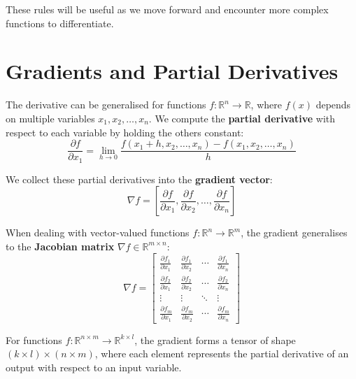 These rules will be useful as we move forward and encounter more complex functions to differentiate.

\section{Gradients and Partial Derivatives}

The derivative can be generalised for functions \( f : \mathbb{R}^n \to \mathbb{R} \), where \( f(x) \) depends on multiple variables \( x_1, x_2, \dots, x_n \). We compute the \textbf{partial derivative} with respect to each variable by holding the others constant:
\begin{equation}
    \frac{\partial f}{\partial x_1} = \lim_{h \to 0} \frac{f(x_1 + h, x_2, \dots, x_n) - f(x_1, x_2, \dots, x_n)}{h}
\end{equation}

We collect these partial derivatives into the \textbf{gradient vector}:
\begin{equation}
    \nabla f = \left[ \frac{\partial f}{\partial x_1}, \frac{\partial f}{\partial x_2}, \dots, \frac{\partial f}{\partial x_n} \right]
\end{equation}

When dealing with vector-valued functions \( f : \mathbb{R}^n \to \mathbb{R}^m \), the gradient generalises to the \textbf{Jacobian matrix} \( \nabla f \in \mathbb{R}^{m \times n} \):
\begin{equation}
    \nabla f = \begin{bmatrix}
        \frac{\partial f_1}{\partial x_1} & \frac{\partial f_1}{\partial x_2} & \cdots & \frac{\partial f_1}{\partial x_n} \\
        \frac{\partial f_2}{\partial x_1} & \frac{\partial f_2}{\partial x_2} & \cdots & \frac{\partial f_2}{\partial x_n} \\
        \vdots                            & \vdots                            & \ddots & \vdots                            \\
        \frac{\partial f_m}{\partial x_1} & \frac{\partial f_m}{\partial x_2} & \cdots & \frac{\partial f_m}{\partial x_n}
    \end{bmatrix}
\end{equation}

For functions \( f: \mathbb{R}^{n \times m} \to \mathbb{R}^{k \times l} \), the gradient forms a tensor of shape \( (k \times l) \times (n \times m) \), where each element represents the partial derivative of an output with respect to an input variable.

